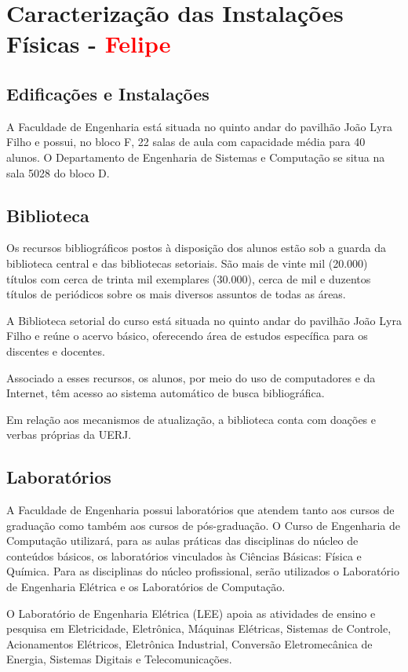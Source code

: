 \chapter{Caracterização das Instalações Físicas - \textcolor{red}{Felipe}}

\section{Edificações e Instalações}
A Faculdade de Engenharia está situada no quinto andar do pavilhão João Lyra Filho e possui, no bloco F, 22 salas de aula com capacidade média para 40 alunos. O Departamento de Engenharia de Sistemas e Computação se situa na sala 5028 do bloco D.

\section{Biblioteca}
Os recursos bibliográficos postos à disposição dos alunos estão sob a guarda da biblioteca central e das bibliotecas setoriais. São mais de vinte mil (20.000) títulos com cerca de trinta mil exemplares (30.000), cerca de mil e duzentos títulos de periódicos sobre os mais diversos assuntos de todas as áreas.

A Biblioteca setorial do curso está situada no quinto andar do pavilhão João Lyra Filho e reúne o acervo básico, oferecendo área de estudos específica para os discentes e docentes.

Associado a esses recursos, os alunos, por meio do uso de computadores e da Internet, têm acesso ao sistema automático de busca bibliográfica.

Em relação aos mecanismos de atualização, a biblioteca conta com doações e verbas próprias da UERJ.

\section{Laboratórios}

A Faculdade de Engenharia possui laboratórios que atendem tanto aos cursos de graduação como também aos cursos de pós-graduação. O Curso de Engenharia de Computação utilizará, para as aulas práticas das disciplinas do núcleo de conteúdos básicos, os laboratórios vinculados às Ciências Básicas: Física e Química. Para as disciplinas do núcleo profissional, serão utilizados o Laboratório de Engenharia Elétrica e os Laboratórios de Computação.

O Laboratório de Engenharia Elétrica (LEE) apoia as atividades de ensino e pesquisa em Eletricidade, Eletrônica, Máquinas Elétricas, Sistemas de Controle, Acionamentos Elétricos, Eletrônica Industrial, Conversão Eletromecânica de Energia, Sistemas Digitais e Telecomunicações.

